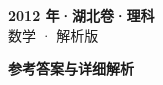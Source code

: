 \documentclass[zihao=-4, a4paper]{ctexart}
\begin{document}
\begin{center}
  {\Large\bfseries 2012 年·湖北卷·理科}\\[4pt]
  {\large 数学 · 解析版}
\end{center}
\medskip
{}

\clearpage
{}
\begin{center}{\Large\bfseries 参考答案与详细解析}\end{center}
\medskip

\end{document}
